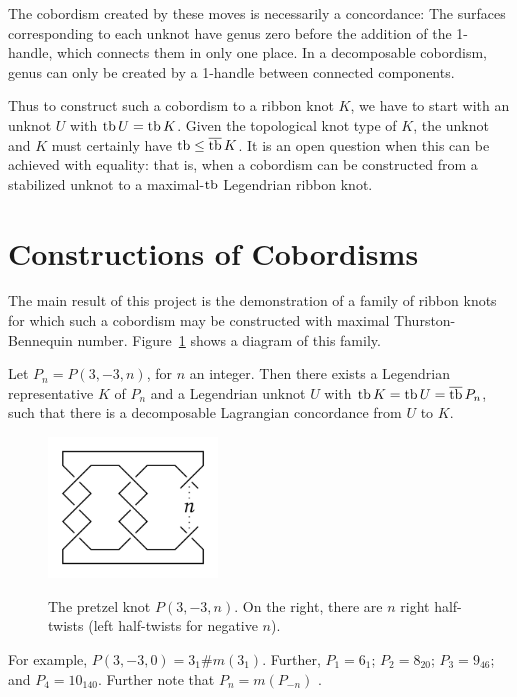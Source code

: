 The cobordism created by these moves is necessarily a concordance: The surfaces corresponding to each unknot have genus zero before the addition of the 1-handle, which connects them in only one place. In a decomposable cobordism, genus can only be created by a 1-handle between connected components.

Thus to construct such a cobordism to a ribbon knot $K$, we have to start with an unknot $U$ with $\operatorname{tb} U = \operatorname{tb} K$. Given the topological knot type of $K$, the unknot and $K$ must certainly have $\operatorname{tb} \leq \overline{\operatorname{tb}}\, K$.
It is an open question when this can be achieved with equality: that is, when a cobordism can be constructed from a stabilized unknot to a maximal-$\operatorname{tb}$ Legendrian ribbon knot.

\section{Constructions of Cobordisms}
The main result of this project is the demonstration of a family of ribbon knots for which such a cobordism may be constructed with maximal Thurston-Bennequin number. Figure~\ref{fig:pretzel-knot} shows a diagram of this family.

\begin{theorem}\label{thm:mine}
    Let $P_n = P(3, -3, n)$, for $n$ an integer. Then there exists a Legendrian representative $K$ of $P_n$ and a Legendrian unknot $U$ with $\operatorname{tb} K = \operatorname{tb} U = \overline{\operatorname{tb}}\, P_n$, such that there is a decomposable Lagrangian concordance from $U$ to $K$.
\end{theorem}

\begin{figure}[ht!]
    \centering
    \includegraphics[width=0.4\textwidth]{images/pretzel-knot.pdf}
    \label{fig:pretzel-knot}
    \caption{The pretzel knot $P(3, -3, n)$. On the right, there are $n$ right half-twists (left half-twists for negative $n$).}
\end{figure}

For example, $P(3, -3, 0) = 3_1 \# m(3_1)$. Further, $P_1 = 6_1$; $P_2 = 8_{20}$; $P_3 = 9_{46}$; and $P_4 = 10_{140}$. Further note that $P_n = m(P_{-n})$ \cite{kawauchi}.

